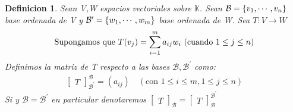 \documentclass[]{article}
\newtheorem{definition}{Definicion}
\newcommand{\K}{
    \mathbb{K}
}
\newcommand{\base}{\text{$\mathcal{B}$}}
\newcommand{\basep}{\text{$\mathcal{B}^{\prime}$}}
\begin{document}
\begin{definition}
    Sean V,W espacios vectoriales sobre $\K$. Sean $\base=\conjunto{\vc{1},\cdots,\vc{n}}$ base ordenada de V y
    $\basep=\conjunto{\wc{1},\cdots,\wc{m}}$ base ordenada de W. Sea $T:V\to W$ \tl
    \begin{align*}
        \text{Supongamos que } T(\text{$v_{j}$})=\sum_{i=1}^{m} a_{ij}\text{$w_{i}$} \text{ (cuando $1 \leq j \leq n$)}
    \end{align*}
    Definimos la matriz de T respecto a las bases $\base , \basep$ como:
    \begin{align*}
        \begin{bmatrix} T \end{bmatrix}_{\basep}^{\base}=(a_{ij}) \quad (\text{con }1\leq i\leq m,1\leq j\leq n)
    \end{align*}
    Si  y $\base=\basep$ en particular denotaremos
    $\begin{bmatrix} T \end{bmatrix}_{\base} =\begin{bmatrix} T \end{bmatrix}_{\base}^{\basep}$

\end{definition}
\end{document}
